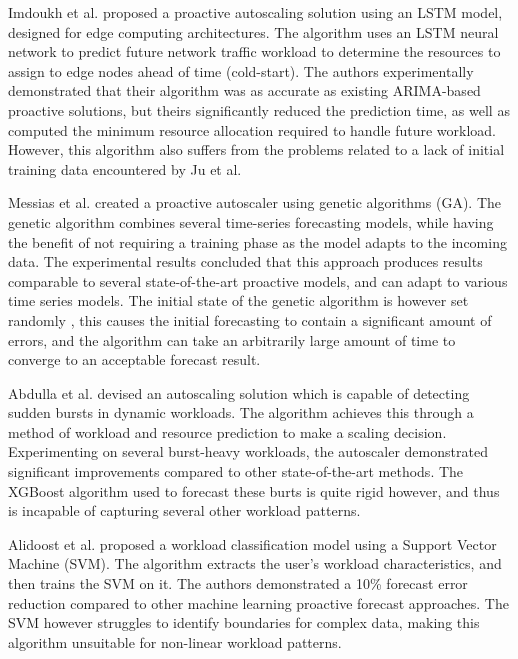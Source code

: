 
Imdoukh et al. \cite{imdoukh2020machine} proposed a proactive autoscaling solution using an LSTM model, designed for edge computing architectures. The algorithm uses an LSTM neural network to predict future network traffic workload to determine the resources to assign to edge nodes ahead of time (cold-start). The authors experimentally demonstrated that their algorithm was as accurate as existing ARIMA-based proactive solutions, but theirs significantly reduced the prediction time, as well as computed the minimum resource allocation required to handle future workload. However, this algorithm also suffers from the problems related to a lack of initial training data encountered by Ju et al. \cite{ju2021proactive}\par


Messias et al. \cite{messias2016combining} created a proactive autoscaler using genetic algorithms (GA). The genetic algorithm combines several time-series forecasting models, while having the benefit of not requiring a training phase as the model adapts to the incoming data. The experimental results concluded that this approach produces results comparable to several state-of-the-art proactive models, and can adapt to various time series models. The initial state of the genetic algorithm is however set randomly \cite{lambora2019genetic}, this causes the initial forecasting to contain a significant amount of errors, and the algorithm can take an arbitrarily large amount of time to converge to an acceptable forecast result.\par

Abdulla et al. \cite{abdullah2020burst} devised an autoscaling solution which is capable of detecting sudden bursts in dynamic workloads. The algorithm achieves this through a method of workload and resource prediction to make a scaling decision. Experimenting on several burst-heavy workloads, the autoscaler demonstrated significant improvements compared to other state-of-the-art methods. The XGBoost algorithm used to forecast these burts is quite rigid however, and thus is incapable of capturing several other workload patterns.\par

Alidoost et al. \cite{alidoost2023introducing} proposed a workload classification model using a Support Vector Machine (SVM). The algorithm extracts the user's workload characteristics, and then trains the SVM on it. The authors demonstrated a 10\% forecast error reduction compared to other machine learning proactive forecast approaches. The SVM however struggles to identify boundaries for complex data, making this algorithm unsuitable for non-linear workload patterns.\par


